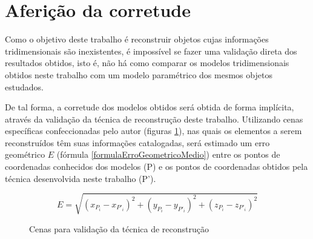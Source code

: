 \section{Aferição da corretude}

	Como o objetivo deste trabalho é reconstruir objetos cujas informações tridimensionais são inexistentes, é impossível se fazer uma validação direta dos resultados obtidos, isto é, não há como comparar os modelos tridimensionais obtidos neste trabalho com um modelo paramétrico dos mesmos objetos estudados.

	De tal forma, a corretude dos modelos obtidos será obtida de forma implícita, através da validação da técnica de reconstrução deste trabalho. Utilizando cenas específicas confeccionadas pelo autor (figuras \ref{cenasValidacao}), nas quais os elementos a serem reconstruídos têm suas informações catalogadas, será estimado um erro geométrico $E$ (fórmula \ref{formulaErroGeometricoMedio}) entre os pontos de coordenadas conhecidos dos modelos (P) e os pontos de coordenadas obtidos pela técnica desenvolvida neste trabalho (P'). 
	
\begin{equation}
	\label{formulaErroGeometricoMedio}
	E = \sqrt{(x_{P_i} - x_{P'_i})^2 + (y_{P_i} - y_{P'_i})^2 + (z_{P_i} - z_{P'_i})^2} 
\end{equation}
	
\begin{figure}[!htb]
	\centering
	\quad
	\quad
	\caption{Cenas para validação da técnica de reconstrução}
	\label{cenasValidacao}
\end{figure}


